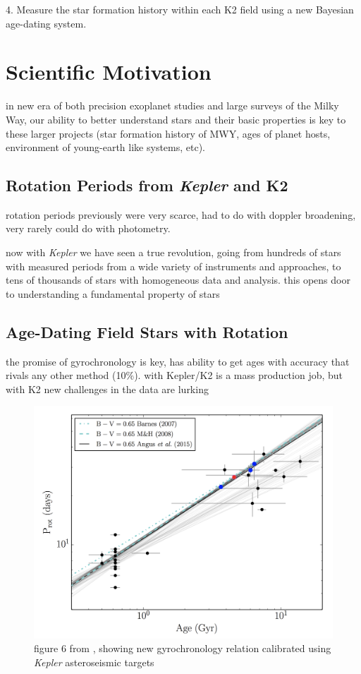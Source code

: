 \documentclass[12pt]{article}
\newcommand{\Kepler}{\textsl{Kepler}\xspace}
\begin{document}
4. Measure the star formation history within each K2 field using a new Bayesian age-dating system.



\clearpage



\section{Scientific Motivation}
in new era of both precision exoplanet studies and large surveys of the Milky Way, our ability to better understand stars and their basic properties is key to these larger projects (star formation history of MWY, ages of planet hosts, environment of young-earth like systems, etc).


\subsection{Rotation Periods from \Kepler and K2}
rotation periods previously were very scarce, had to do with doppler broadening, very rarely could do with photometry.

now with \Kepler we have seen a true revolution, going from hundreds of stars with measured periods from a wide variety of instruments and approaches, to tens of thousands of stars with homogeneous data and analysis. this opens door to understanding a fundamental property of stars


\subsection{Age-Dating Field Stars with Rotation}

\citet{skumanich1972}
\citet{barnes2007}
the promise of gyrochronology is key, has ability to get ages with accuracy that rivals any other method (10\%). with Kepler/K2 is a mass production job, but with K2 new challenges in the data are lurking

\begin{figure}[!th]
\centering
\includegraphics[width=4.5in]{angus2015_fig6.png}
\caption{figure 6 from \citet{angus2015}, showing new gyrochronology relation calibrated using \Kepler asteroseismic targets
}
\label{fig:gyro}
\end{figure}
\end{document}

